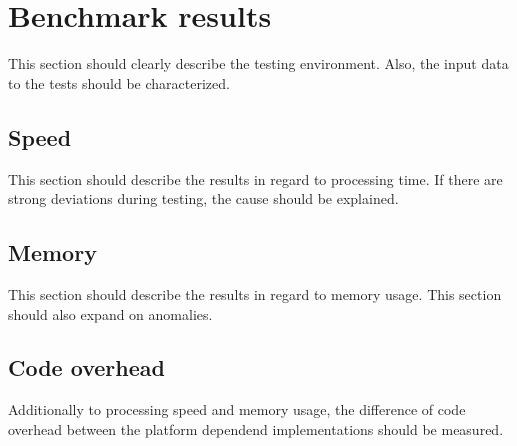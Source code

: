 \section{Benchmark results}
This section should clearly describe the testing environment. Also, the input data to the tests should be characterized.

\subsection{Speed}
This section should describe the results in regard to processing time. If there are strong deviations during testing, the cause should be explained. 

\subsection{Memory}
This section should describe the results in regard to memory usage. This section should also expand on anomalies. 

\subsection{Code overhead}
Additionally to processing speed and memory usage, the difference of code overhead between the platform dependend implementations should be measured. 
